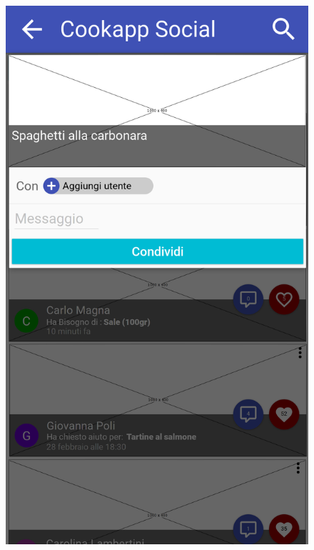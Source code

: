 \begin{figure}[H]
\begin{minipage}{.49\textwidth}
		\includegraphics[width=\textwidth]{img/wireframe/condividi_ricetta_selezionata.png}
	\end{minipage}
\end{figure}
